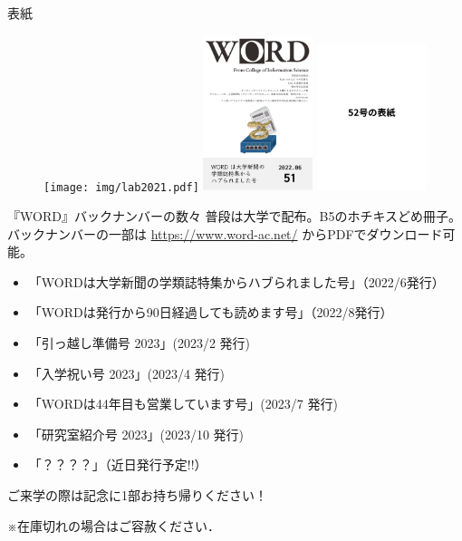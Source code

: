 \documentclass[lualatex]{beamer}
\begin{document}
\begin{frame}[plain]{表紙}
 \begin{figure}
  \centering
  \texttt{[image: img/lab2021.pdf]}
  \includegraphics[width=32mm]{img/word51.pdf}
  \includegraphics[width=32mm]{img/word52.pdf}
 \end{figure}
\end{frame}
\begin{frame}[plain]{『WORD』バックナンバーの数々}
 普段は大学で配布。B5のホチキスどめ冊子。
	バックナンバーの一部は \url{https://www.word-ac.net/} からPDFでダウンロード可能。

\begin{itemize}
 \item 「WORDは大学新聞の学類誌特集からハブられました号」（2022/6発行）
 \item 「WORDは発行から90日経過しても読めます号」（2022/8発行）
 \item 「引っ越し準備号 2023」(2023/2 発行)
 \item  「入学祝い号 2023」(2023/4 発行)
 \item 「WORDは44年目も営業しています号」(2023/7 発行)
 \item 「研究室紹介号 2023」(2023/10 発行)
 \item 「？？？？」（近日発行予定!!）
\end{itemize}

ご来学の際は記念に1部お持ち帰りください！

	\small{※在庫切れの場合はご容赦ください．}
\end{frame}
\end{document}
